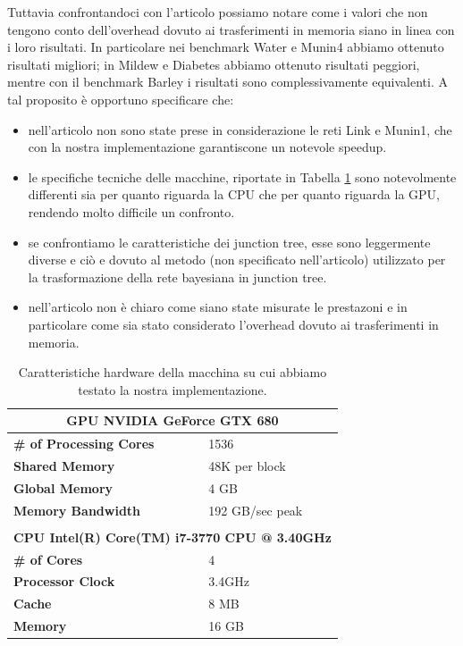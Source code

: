 \documentclass[a4paper]{article}   %
\begin{document}
Tuttavia confrontandoci con l'articolo \cite{zheng2011belief} possiamo notare come i valori che non tengono conto dell'overhead dovuto ai trasferimenti in memoria siano in linea con i loro risultati.
In particolare nei benchmark Water e Munin4 abbiamo ottenuto risultati migliori; in Mildew e Diabetes abbiamo ottenuto risultati peggiori, mentre con il benchmark Barley i risultati sono complessivamente equivalenti.
A tal proposito è opportuno specificare che:
\begin{itemize}
\item nell'articolo \cite{zheng2011belief} non sono state prese in considerazione le reti Link e Munin1, che con la nostra implementazione garantiscone un notevole speedup.
\item le specifiche tecniche delle macchine, riportate in Tabella \ref{tab:hw} sono notevolmente differenti sia per quanto riguarda la CPU che per quanto riguarda la GPU, rendendo molto difficile un confronto.
\item %
se confrontiamo le caratteristiche dei junction tree, esse sono leggermente diverse e ciò e dovuto al metodo (non specificato nell'articolo) utilizzato per la trasformazione della rete bayesiana in junction tree.
\item nell'articolo \cite{zheng2011belief} non è chiaro come siano state misurate le prestazoni e in particolare come sia stato considerato l'overhead dovuto ai trasferimenti in memoria. %
\end{itemize}


\begin{table}
\centering
\begin{tabular}{l | l}
\toprule
\multicolumn{2}{c}{\textbf{GPU NVIDIA GeForce GTX 680}} \\
\midrule
\textbf{\# of Processing Cores}	& 1536 \\
\textbf{Shared Memory} &	48K per block \\
\textbf{Global Memory} &	4 GB \\
\textbf{Memory Bandwidth} &	192 GB/sec peak \\
\bottomrule
\multicolumn{2}{c}{} \\
\toprule
\multicolumn{2}{c}{\textbf{CPU	Intel(R) Core(TM) i7-3770 CPU @ 3.40GHz}} \\
\midrule
\textbf{\# of Cores} &	4 \\
\textbf{Processor Clock} &	3.4GHz  \\
\textbf{Cache} &	8 MB \\
\textbf{Memory} &	16 GB \\
\bottomrule
\end{tabular}
\caption{Caratteristiche hardware della macchina su cui abbiamo testato la nostra implementazione.}
\label{tab:hw}
\end{table}
\end{document}
